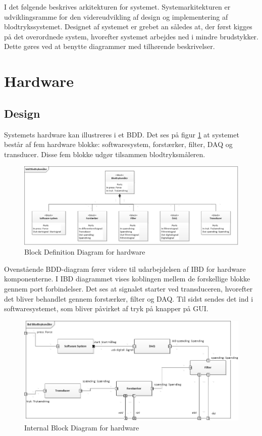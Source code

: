 I det følgende beskrives arkitekturen for systemet. Systemarkitekturen er udviklingsramme for den videreudvikling af design og implementering af blodtrykssystemet. Designet af systemet er grebet an således at, der først kigges på det overordnede system, hvorefter systemet arbejdes ned i mindre brudstykker. Dette gøres ved at benytte diagrammer med tilhørende beskrivelser.

\section{Hardware}
\subsection{Design}
Systemets hardware kan illustreres i et BDD. Det ses på figur \ref{fig:BDD} at systemet består af fem hardware blokke: softwaresystem, forstærker, filter, DAQ og transducer. Disse fem blokke udgør tilsammen blodtryksmåleren.  
	
\begin{figure}[H]
	\centering
	\includegraphics[width=1.0\textwidth]{Figurer/BDD}
	\caption{Block Definition Diagram for hardware}
	\label{fig:BDD}
\end{figure}

Ovenstående BDD-diagram fører videre til udarbejdelsen af IBD for hardware komponenterne. I IBD diagrammet vises koblingen mellem de forskellige blokke gennem port forbindelser. Det ses at signalet starter ved transduceren, hvorefter det bliver behandlet gennem forstærker, filter og DAQ. Til sidst sendes det ind i softwaresystemet, som bliver påvirket af tryk på knapper på GUI. 

\begin{figure}[H]
	\centering
	\includegraphics[width=1.0\textwidth]{Figurer/IBD}
	\caption{Internal Block Diagram for hardware}
	\label{fig:IBD}
\end{figure}

